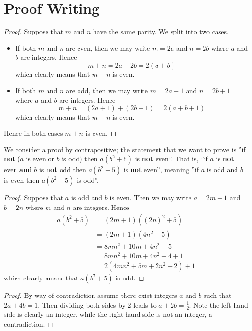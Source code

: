 \section{Proof Writing}
\begin{questions}
    \item \begin{proof}
        Suppose that $m$ and $n$ have the same parity. We split into two cases.
        \begin{itemize}
            \item If both $m$ and $n$ are even, then we may write $m = 2a$ and $n = 2b$ where $a$ and $b$ are integers. Hence
            \[
                m + n = 2a + 2b = 2(a+b)        
            \]
            which clearly means that $m + n$ is even.
            \item If both $m$ and $n$ are odd, then we may write $m = 2a + 1$ and $n = 2b + 1$ where $a$ and $b$ are integers. Hence
            \[
                m + n = (2a + 1) + (2b + 1) = 2(a + b + 1)        
            \]
            which clearly means that $m+n$ is even.
        \end{itemize}
    Hence in both cases $m + n$ is even.
    \end{proof}
    
    \item We consider a proof by contrapositive; the statement that we want to prove is ''if \textbf{not} ($a$ is even or $b$ is odd) then $a(b^2+5)$ is \textbf{not} even''. That is, ''if $a$ is \textbf{not} even \textbf{and} $b$ is \textbf{not} odd then $a(b^2+5)$ is \textbf{not} even'', meaning ''if $a$ is odd and $b$ is even then $a(b^2+5)$ is odd''.
    
    \begin{proof}
        Suppose that $a$ is odd and $b$ is even. Then we may write $a = 2m + 1$ and $b = 2n$ where $m$ and $n$ are integers. Hence
    \begin{align*}
        a(b^2+5) &= (2m+1)\left((2n)^2 + 5\right)\\
        &= (2m+1)(4n^2 + 5)\\
        &= 8mn^2 + 10m + 4n^2 + 5\\
        &= 8mn^2 + 10m + 4n^2 + 4 + 1\\
        &= 2(4mn^2 + 5m + 2n^2 + 2) + 1
    \end{align*}
    which clearly means that $a(b^2+5)$ is odd.
    \end{proof}
    
    \item \begin{proof}
        By way of contradiction assume there exist integers $a$ and $b$ such that $2a + 4b = 1$. Then dividing both sides by 2 leads to $a + 2b = \frac12$. Note the left hand side is clearly an integer, while the right hand side is not an integer, a contradiction.    
    \end{proof}
    

\end{questions}
